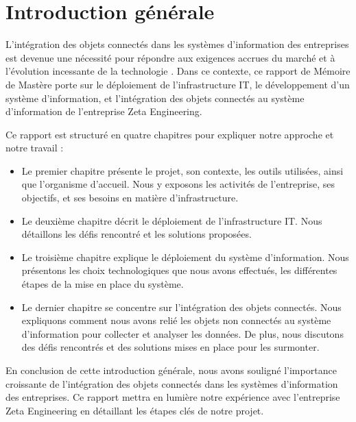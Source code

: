 \chapter*{Introduction générale}

\setlength{\parskip}{1em}
\setlength{\parindent}{1cm}

\large {
L'intégration des objets connectés dans les systèmes d’information des entreprises est devenue une nécessité pour répondre aux exigences accrues du marché et à l’évolution incessante de la technologie \cite{antoine2019vers}. Dans ce contexte, ce rapport de Mémoire de Mastère porte sur le déploiement de l'infrastructure IT, le développement d'un système d'information, et l'intégration des objets connectés au système d’information de l’entreprise Zeta Engineering.

Ce rapport est structuré en quatre chapitres pour expliquer notre approche et notre travail :

\begin{itemize}
\item Le premier chapitre présente le projet, son contexte, les outils utilisées, ainsi que l'organisme d'accueil. Nous y exposons les activités de l'entreprise, ses objectifs, et ses besoins en matière d'infrastructure.
\item Le deuxième chapitre décrit le déploiement de l'infrastructure IT. Nous détaillons les défis rencontré et les solutions proposées.
\item Le troisième chapitre explique le déploiement du système d'information. Nous présentons les choix technologiques que nous avons effectués, les différentes étapes de la mise en place du système.
\item Le dernier chapitre se concentre sur l'intégration des objets connectés. Nous expliquons comment nous avons relié les objets non connectés au système d'information pour collecter et analyser les données. De plus, nous discutons des défis rencontrés et des solutions mises en place pour les surmonter.
\end{itemize}

En conclusion de cette introduction générale, nous avons souligné l'importance croissante de l'intégration des objets connectés dans les systèmes d’information des entreprises. Ce rapport mettra en lumière notre expérience avec l'entreprise Zeta Engineering en détaillant les étapes clés de notre projet.
}
